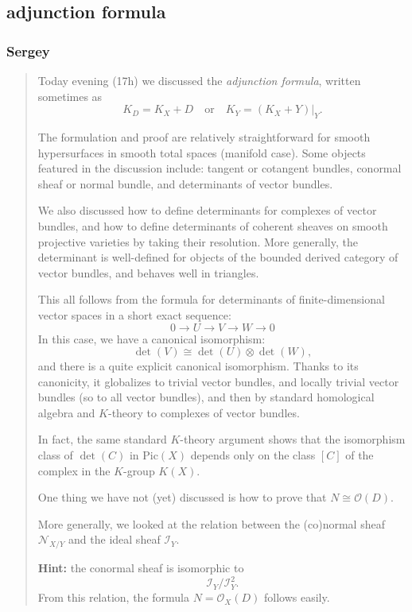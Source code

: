 \subsection{adjunction formula}

\subsubsection{Sergey}

\begin{quotation}
	Today evening (17h) we discussed the \emph{adjunction formula}, written sometimes as 
\[ K_D = K_X + D \quad \text{or} \quad K_Y = (K_X + Y)|_Y. \]

The formulation and proof are relatively straightforward for smooth hypersurfaces in smooth total spaces (manifold case). Some objects featured in the discussion include: tangent or cotangent bundles, conormal sheaf or normal bundle, and determinants of vector bundles.

We also discussed how to define determinants for complexes of vector bundles, and how to define determinants of coherent sheaves on smooth projective varieties by taking their resolution. More generally, the determinant is well-defined for objects of the bounded derived category of vector bundles, and behaves well in triangles.

This all follows from the formula for determinants of finite-dimensional vector spaces in a short exact sequence:
\[
0 \longrightarrow U \longrightarrow V \longrightarrow W \longrightarrow 0
\]
In this case, we have a canonical isomorphism:
\[
\det(V) \cong \det(U) \otimes \det(W),
\]
and there is a quite explicit canonical isomorphism. Thanks to its canonicity, it globalizes to trivial vector bundles, and locally trivial vector bundles (so to all vector bundles), and then by standard homological algebra and $K$-theory to complexes of vector bundles.

In fact, the same standard $K$-theory argument shows that the isomorphism class of $\det(C)$ in $\mathrm{Pic}(X)$ depends only on the class $[C]$ of the complex in the $K$-group $K(X)$.

\medskip

\noindent One thing we have not (yet) discussed is how to prove that $N \cong \mathcal{O}(D)$.

More generally, we looked at the relation between the (co)normal sheaf $\mathcal{N}_{X/Y}$ and the ideal sheaf $\mathcal{I}_Y$.

\medskip

\noindent \textbf{Hint:} the conormal sheaf is isomorphic to
\[
\mathcal{I}_Y / \mathcal{I}_Y^2.
\]
From this relation, the formula $N = \mathcal{O}_X(D)$ follows easily.
\end{quotation}

